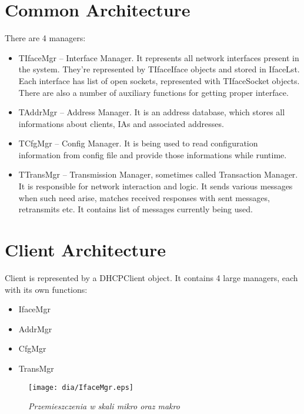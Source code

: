 
\section{Common Architecture}

There are 4 managers:
\begin{itemize}
\item TIfaceMgr -- Interface Manager. It represents all network interfaces present in the
  system. They're represented by TIfaceIface objects and stored in
  IfaceLst. Each interface has list of open sockets, represented with
  TIfaceSocket objects. There are also a number of auxiliary functions
  for getting proper interface. 
\item TAddrMgr -- Address Manager. It is an address database, which
  stores all informations about clients, IAs and associated addresses.
\item TCfgMgr -- Config Manager. It is being used to read
  configuration information from config file and provide those
  informations while runtime.
\item TTransMgr -- Transmission Manager, sometimes called Transaction
  Manager. It is responsible for network interaction and logic. It
  sends various messages when such need arise, matches received
  responses with sent messages, retransmits etc. It contains list of
  messages currently being used.
\end{itemize}

\section{Client Architecture}

Client is represented by a DHCPClient object. It contains 4 large
managers, each with its own functions:
\begin{itemize}
\item IfaceMgr
\item AddrMgr
\item CfgMgr
\item TransMgr

\end{itemize}

\begin{figure}[!h]
\begin{center}
\texttt{[image: dia/IfaceMgr.eps]}
\caption{\emph{Przemieszczenia w skali mikro oraz makro}}
\label{micromacro}
\end{center}
\end{figure}


